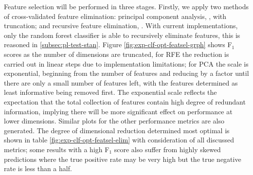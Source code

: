             Feature selection will be performed in three stages. Firstly, we apply two methods of cross-validated feature elimination: principal component analysis, , with truncation; and recursive feature elimination, . With current implementations, only the random forest classifier is able to recursively eliminate features, this is reasoned in \ref{subsec:pl-test-stan}. Figure \ref{fig:exp-clf-opt-featsel-grph} shows F$_{1}$ scores as the number of dimensions are truncated, for RFE the reduction is carried out in linear steps due to implementation limitations; for PCA the scale is exponential, beginning from the number of features and reducing by a factor until there are only a small number of features left, with the features determined as least informative being removed first. The exponential scale reflects the expectation that the total collection of features contain high degree of redundant information, implying there will be more significant effect on performance at lower dimensions. Similar plots for the other performance metrics are also generated. The degree of dimensional reduction determined most optimal is shown in table \ref{fig:exp-clf-opt-featsel-elim} with consideration of all discussed metrics; some results with a high F$_{1}$ score also suffer from highly skewed predictions where the true positive rate may be very high but the true negative rate is less than a half.
            
